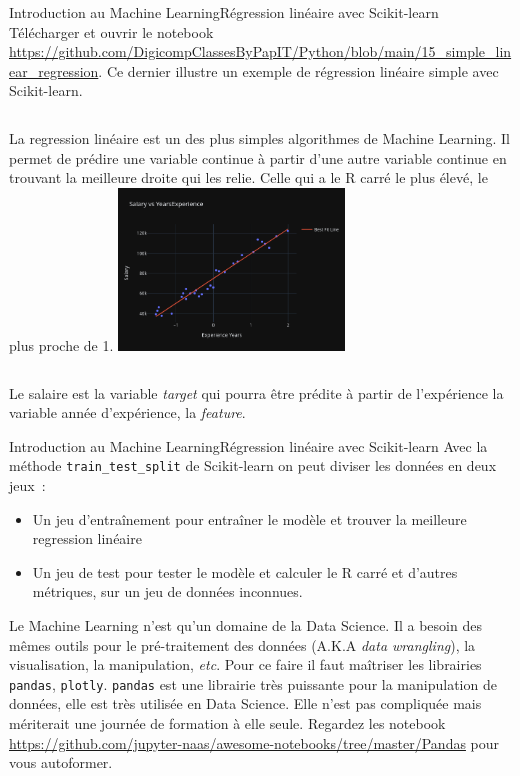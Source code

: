 \documentclass{beamer}
\begin{document}
    \begin{frame}{Introduction au Machine Learning}{Régression linéaire avec Scikit-learn}
        Télécharger et ouvrir le notebook \url{https://github.com/DigicompClassesByPapIT/Python/blob/main/15_simple_linear_regression}.
        Ce dernier illustre un exemple de régression linéaire simple avec Scikit-learn.
        \bigbreak
        \begin{columns}
            La regression linéaire est un des plus simples algorithmes de Machine Learning.
            Il permet de prédire une variable continue à partir d'une autre variable continue en trouvant la meilleure droite qui les relie.
            Celle qui a le R carré le plus élevé, le plus proche de 1.
            \centering
            \includegraphics[width=6cm]{image/linear-regression}
        \end{columns}
        \bigbreak
        Le salaire est la variable \textit{target} qui pourra être prédite à partir de l'expérience la variable année d'expérience, la \textit{feature}.
    \end{frame}

    \begin{frame}{Introduction au Machine Learning}{Régression linéaire avec Scikit-learn}
        Avec la méthode \lstinline{train_test_split} de Scikit-learn on peut diviser les données en deux jeux~:
        \begin{itemize}
            \item Un jeu d'entraînement pour entraîner le modèle et trouver la meilleure regression linéaire
            \item Un jeu de test pour tester le modèle et calculer le R carré et d'autres métriques, sur un jeu de données inconnues.
        \end{itemize}
        \begin{dangercolorbox}
            Le Machine Learning n'est qu'un domaine de la Data Science.
            Il a besoin des mêmes outils pour le pré-traitement des données (A.K.A \textit{data wrangling}), la visualisation, la manipulation, \textit{etc}.
            Pour ce faire il faut maîtriser les librairies \lstinline{pandas}, \lstinline{plotly}.
            \lstinline{pandas} est une librairie très puissante pour la manipulation de données, elle est très utilisée en Data Science.
            Elle n'est pas compliquée mais mériterait une journée de formation à elle seule.
            Regardez les notebook \url{https://github.com/jupyter-naas/awesome-notebooks/tree/master/Pandas} pour vous autoformer.
        \end{dangercolorbox}
    \end{frame}
\end{document}
